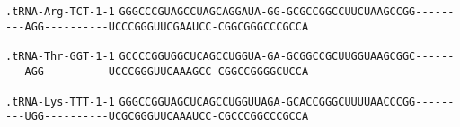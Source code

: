 \documentclass{article}
\newcommand{\rnabox}[1]{\colorbox{#1}{\texttt{#1}}}
\begin{document}
\texttt{.tRNA-Arg-TCT-1-1}
\rnabox{G}\rnabox{G}\rnabox{G}\rnabox{C}\rnabox{C}\rnabox{C}\rnabox{G}\rnabox{U}\rnabox{A}\rnabox{G}\rnabox{C}\rnabox{C}\rnabox{U}\rnabox{A}\rnabox{G}\rnabox{C}\rnabox{A}\rnabox{G}\rnabox{G}\rnabox{A}\rnabox{U}\rnabox{A}\rnabox{-}\rnabox{G}\rnabox{G}\rnabox{-}\rnabox{G}\rnabox{C}\rnabox{G}\rnabox{C}\rnabox{C}\rnabox{G}\rnabox{G}\rnabox{C}\rnabox{C}\rnabox{U}\rnabox{U}\rnabox{C}\rnabox{U}\rnabox{A}\rnabox{A}\rnabox{G}\rnabox{C}\rnabox{C}\rnabox{G}\rnabox{G}\rnabox{-}\rnabox{-}\rnabox{-}\rnabox{-}\rnabox{-}\rnabox{-}\rnabox{-}\rnabox{-}\rnabox{-}\rnabox{A}\rnabox{G}\rnabox{G}\rnabox{-}\rnabox{-}\rnabox{-}\rnabox{-}\rnabox{-}\rnabox{-}\rnabox{-}\rnabox{-}\rnabox{-}\rnabox{-}\rnabox{U}\rnabox{C}\rnabox{C}\rnabox{C}\rnabox{G}\rnabox{G}\rnabox{G}\rnabox{U}\rnabox{U}\rnabox{C}\rnabox{G}\rnabox{A}\rnabox{A}\rnabox{U}\rnabox{C}\rnabox{C}\rnabox{-}\rnabox{C}\rnabox{G}\rnabox{G}\rnabox{C}\rnabox{G}\rnabox{G}\rnabox{G}\rnabox{C}\rnabox{C}\rnabox{C}\rnabox{G}\rnabox{C}\rnabox{C}\rnabox{A}

\vspace{-0.5mm}

\texttt{.tRNA-Thr-GGT-1-1}
\rnabox{G}\rnabox{C}\rnabox{C}\rnabox{C}\rnabox{C}\rnabox{G}\rnabox{G}\rnabox{U}\rnabox{G}\rnabox{G}\rnabox{C}\rnabox{U}\rnabox{C}\rnabox{A}\rnabox{G}\rnabox{C}\rnabox{C}\rnabox{U}\rnabox{G}\rnabox{G}\rnabox{U}\rnabox{A}\rnabox{-}\rnabox{G}\rnabox{A}\rnabox{-}\rnabox{G}\rnabox{C}\rnabox{G}\rnabox{G}\rnabox{C}\rnabox{C}\rnabox{G}\rnabox{C}\rnabox{U}\rnabox{U}\rnabox{G}\rnabox{G}\rnabox{U}\rnabox{A}\rnabox{A}\rnabox{G}\rnabox{C}\rnabox{G}\rnabox{G}\rnabox{C}\rnabox{-}\rnabox{-}\rnabox{-}\rnabox{-}\rnabox{-}\rnabox{-}\rnabox{-}\rnabox{-}\rnabox{-}\rnabox{A}\rnabox{G}\rnabox{G}\rnabox{-}\rnabox{-}\rnabox{-}\rnabox{-}\rnabox{-}\rnabox{-}\rnabox{-}\rnabox{-}\rnabox{-}\rnabox{-}\rnabox{U}\rnabox{C}\rnabox{C}\rnabox{C}\rnabox{G}\rnabox{G}\rnabox{G}\rnabox{U}\rnabox{U}\rnabox{C}\rnabox{A}\rnabox{A}\rnabox{A}\rnabox{G}\rnabox{C}\rnabox{C}\rnabox{-}\rnabox{C}\rnabox{G}\rnabox{G}\rnabox{C}\rnabox{C}\rnabox{G}\rnabox{G}\rnabox{G}\rnabox{G}\rnabox{C}\rnabox{U}\rnabox{C}\rnabox{C}\rnabox{A}

\vspace{-0.5mm}

\texttt{.tRNA-Lys-TTT-1-1}
\rnabox{G}\rnabox{G}\rnabox{G}\rnabox{C}\rnabox{C}\rnabox{G}\rnabox{G}\rnabox{U}\rnabox{A}\rnabox{G}\rnabox{C}\rnabox{U}\rnabox{C}\rnabox{A}\rnabox{G}\rnabox{C}\rnabox{C}\rnabox{U}\rnabox{G}\rnabox{G}\rnabox{U}\rnabox{U}\rnabox{A}\rnabox{G}\rnabox{A}\rnabox{-}\rnabox{G}\rnabox{C}\rnabox{A}\rnabox{C}\rnabox{C}\rnabox{G}\rnabox{G}\rnabox{G}\rnabox{C}\rnabox{U}\rnabox{U}\rnabox{U}\rnabox{U}\rnabox{A}\rnabox{A}\rnabox{C}\rnabox{C}\rnabox{C}\rnabox{G}\rnabox{G}\rnabox{-}\rnabox{-}\rnabox{-}\rnabox{-}\rnabox{-}\rnabox{-}\rnabox{-}\rnabox{-}\rnabox{-}\rnabox{U}\rnabox{G}\rnabox{G}\rnabox{-}\rnabox{-}\rnabox{-}\rnabox{-}\rnabox{-}\rnabox{-}\rnabox{-}\rnabox{-}\rnabox{-}\rnabox{-}\rnabox{U}\rnabox{C}\rnabox{G}\rnabox{C}\rnabox{G}\rnabox{G}\rnabox{G}\rnabox{U}\rnabox{U}\rnabox{C}\rnabox{A}\rnabox{A}\rnabox{A}\rnabox{U}\rnabox{C}\rnabox{C}\rnabox{-}\rnabox{C}\rnabox{G}\rnabox{C}\rnabox{C}\rnabox{C}\rnabox{G}\rnabox{G}\rnabox{C}\rnabox{C}\rnabox{C}\rnabox{G}\rnabox{C}\rnabox{C}\rnabox{A}
\end{document}
